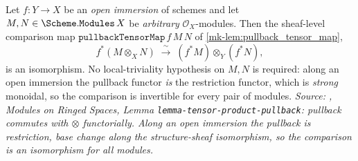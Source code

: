 \begin{lemma}\label{mk-lem:pullback_tensor_map_isiso_open_immersion}

  Let \(f : Y \to X\) be an \emph{open immersion} of schemes and let
  \(M, N \in \Scheme.\mathtt{Modules}\,X\) be \emph{arbitrary} \(\mathcal{O}_X\)-modules.
  Then the sheaf-level comparison map \(\mathtt{pullbackTensorMap}\,f\,M\,N\) of
  \ref{mk-lem:pullback_tensor_map},
  \[
    f^*(M \otimes_X N)
      \;\xrightarrow{\;\sim\;}\;
    (f^*M) \otimes_Y (f^*N),
  \]
  is an isomorphism. No local-triviality hypothesis on \(M, N\) is required: along an open
  immersion the pullback functor \emph{is} the restriction functor, which is \emph{strong}
  monoidal, so the comparison is invertible for every pair of modules.
  \textit{Source: \cite{stacks-project}, Modules on Ringed Spaces, Lemma
  \texttt{lemma-tensor-product-pullback}: pullback commutes with \(\otimes\) functorially.
  Along an open immersion the pullback is restriction, base change along the structure-sheaf
  \emph{isomorphism}, so the comparison is an isomorphism for all modules.}
\end{lemma}

